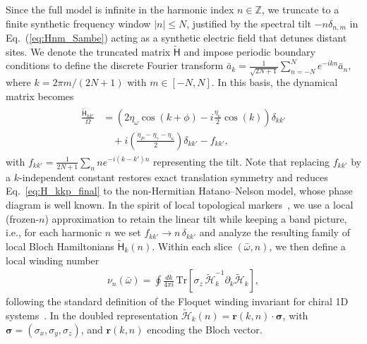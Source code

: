 \documentclass[prl,twocolumn,floatfix,10pt,superscriptaddress]{revtex4-2}
\newcommand{\msf}[1]{\mathsf{#1}}
\newcommand{\mcl}[1]{\mathcal{#1}}
\newcommand{\bsb}[1]{\boldsymbol{#1}}
\newcommand{\bomega}{{\bar{\omega}}}
\newcommand{\mcH}{{\mcl{H}}}
\newcommand{\msH}{{\msf{H}}}
\begin{document}
Since the full model is infinite in the harmonic index $n \in \mathbb{Z}$, we truncate to a finite synthetic frequency window $|n| \leq N$, justified by the spectral tilt $-n\delta_{n,m}$ in Eq.~(\ref{eq:Hnm_Sambe}) acting as a synthetic electric field that detunes distant sites. We denote the truncated matrix $\tilde{\msH}$ and impose periodic boundary conditions to define the discrete Fourier transform $\bar{a}_k = \frac{1}{\sqrt{2N+1}} \sum_{n=-N}^N e^{-i k n} \bar{a}_n$, 
where $k = 2\pi m/(2N+1)$ with $m \in [-N,N]$. In this basis, the dynamical matrix becomes
\begin{align}\label{eq:H_kkp_final}
\begin{aligned}
\frac{\tilde{\msH}_{k k'}}{\Omega} &= 
\left( 2 \eta_\omega \cos(k + \phi) 
- i \frac{\eta_\kappa}{2} \cos(k) \right) \delta_{kk'} \\
&\quad + i\left( \frac{\eta_P-\eta_{\gamma} - \eta_\kappa}{2} \right)\delta_{kk'} - f_{kk'},
\end{aligned}
\end{align}
with $f_{kk'} = \frac{1}{2N+1} \sum_n n e^{-i(k - k')n}$ representing the tilt. Note that replacing $f_{kk'}$ by a $k$-independent constant restores exact translation symmetry and reduces Eq.~\eqref{eq:H_kkp_final} to the non-Hermitian Hatano–Nelson model, whose phase diagram is well known. In the spirit of local topological markers~\cite{BiancoResta2011}, we use a local (frozen-$n$) approximation to retain the linear tilt while keeping a band picture, i.e., for each harmonic $n$ we set $f_{kk'} \to n\,\delta_{kk'}$ and analyze the resulting family of local Bloch Hamiltonians $\tilde{\msH}_{k}(n)$. Within each slice $(\bomega,n)$, we then define a local winding number
\begin{align}
\label{eq:winding_number_Hbar}
\nu_n(\bomega)
=\oint \frac{dk}{4\pi i}\, \mathrm{Tr}\!\left[\sigma_z\, \tilde{\mcH}_k^{-1}\partial_k \tilde{\mcH}_k\right],
\end{align}
following the standard definition of the Floquet winding invariant for chiral 1D systems~\cite{Kitagawa2010}. In the doubled representation $\tilde{\mcH}_k(n)=\bsb{r}(k,n)\cdot\bsb{\sigma}$, with $\bsb{\sigma}=(\sigma_x,\sigma_y,\sigma_z)$, and $\bsb{r}(k,n)$ encoding the Bloch vector. 
\end{document}
